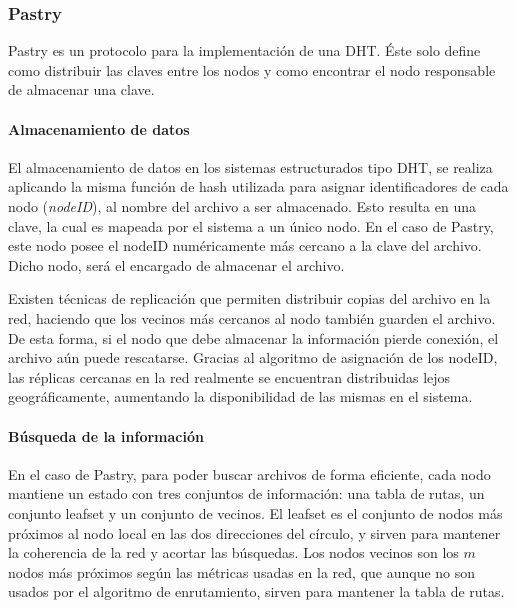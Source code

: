 \subsubsection{Pastry}
\label{sec:pastry}
Pastry es un protocolo para la implementación de una DHT. Éste solo define como
distribuir las claves entre los nodos y como encontrar el nodo responsable de almacenar una clave.

\paragraph{Almacenamiento de datos}

El almacenamiento de datos en los sistemas estructurados tipo DHT, se realiza
aplicando la misma función de hash utilizada para asignar identificadores de
cada nodo (\textit{nodeID}), al nombre del archivo a ser almacenado. Esto resulta en una
clave, la cual es mapeada por el sistema a un único nodo. En el caso de Pastry,
este nodo posee el nodeID numéricamente más cercano a la clave del archivo.
Dicho nodo, será el encargado de almacenar el archivo.

Existen técnicas de replicación que permiten distribuir copias del archivo en
la red, haciendo que los vecinos más cercanos al nodo también guarden el
archivo. De esta forma, si el nodo que debe almacenar la información pierde
conexión, el archivo aún puede rescatarse. Gracias al algoritmo de
asignación de los nodeID, las réplicas cercanas en la red realmente se
encuentran distribuidas lejos geográficamente, aumentando la disponibilidad de
las mismas en el sistema.


\paragraph{Búsqueda de la información}

 En el caso de Pastry, para poder buscar archivos de forma eficiente, cada nodo mantiene un
estado con tres conjuntos de información: una tabla de rutas, un conjunto
leafset y un conjunto de vecinos.
El leafset es el conjunto de nodos más próximos al nodo local en las dos
direcciones del círculo, y sirven para mantener la coherencia de la red y acortar las
búsquedas. Los nodos vecinos son los $m$ nodos más próximos según las
métricas usadas en la red, que aunque no son usados por el algoritmo de
enrutamiento, sirven para mantener la tabla de rutas.

